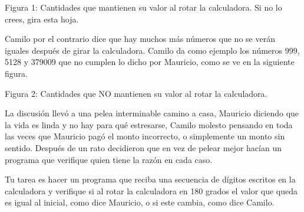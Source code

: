 \documentclass{oci}
\begin{document}
\begin{problemDescription}
\begin{center}
{Figura 1: Cantidades que mantienen su valor al rotar la calculadora. Si no lo crees, gira esta hoja.}
\end{center}

\bigskip
\bigskip


Camilo por el contrario dice que hay muchos más números que no se verán iguales después de girar la calculadora.
Camilo da como ejemplo los números 999, 5128 y 379009 que no cumplen lo dicho por Mauricio, como se ve en la siguiente figura.

\bigskip
\bigskip

\begin{center}
\resizebox{!}{40pt}{} \hspace*{50pt}  
\resizebox{!}{40pt}{} \hspace*{50pt}  
\resizebox{!}{40pt}{}\bigskip

{Figura 2: Cantidades que NO mantienen su valor al rotar la calculadora.}
\end{center}

\bigskip
\bigskip


La discusión llevó a una pelea interminable camino a casa, Mauricio diciendo que
la vida es linda y no hay para qué estresarse, Camilo molesto pensando en toda
las veces que Mauricio pagó el monto incorrecto, o simplemente un monto sin
sentido.
Después de un rato decidieron que en vez de pelear mejor hacían un programa que
verifique quien tiene la razón en cada caso.

Tu tarea es hacer un programa que reciba una secuencia de dígitos escritos
en la calculadora y verifique si al rotar la calculadora en 180
grados el valor que queda es igual al inicial, como dice Mauricio, o si
este cambia, como dice Camilo.

  
%

%
%

\end{problemDescription}
\end{document}

